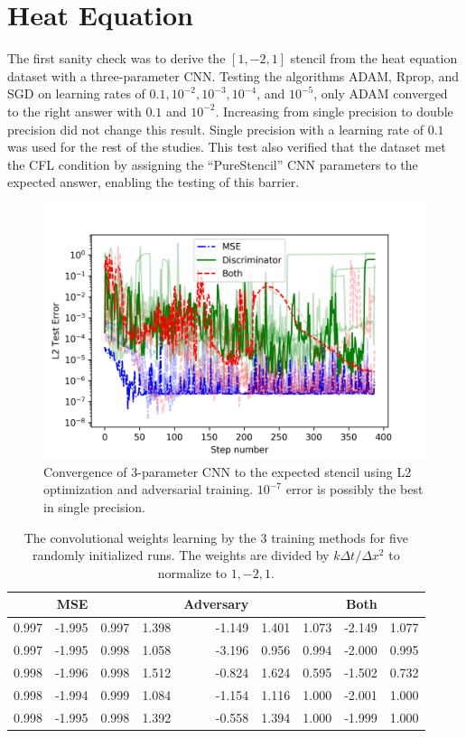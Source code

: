 \documentclass{article}
\begin{document}
\section{Heat Equation}

The first sanity check was to derive the $[1,-2,1]$ stencil from the heat equation dataset with a three-parameter CNN.
Testing the algorithms ADAM, Rprop, and SGD on learning rates of $0.1, 10^{-2}, 10^{-3}, 10^{-4}$, and $10^{-5}$, only ADAM converged to the right answer with $0.1$ and $10^{-2}$. Increasing from single precision to double precision did not change this result. Single precision with a learning rate of $0.1$ was used for the rest of the studies.
This test also verified that the dataset met the CFL condition by assigning the ``PureStencil'' CNN parameters to the expected answer, enabling the testing of this barrier.

\begin{figure}
  \centering
  \includegraphics[width=5in]{3pt_L2_loss.png}
  \caption{Convergence of 3-parameter CNN to the expected stencil
    using L2 optimization and adversarial
    training. $10^{-7}$ error is possibly the best in single precision.}
\end{figure}

\begin{table}
  \caption{The convolutional weights learning by the 3 training
    methods for five randomly initialized runs. The weights are
    divided by $k \Delta t / \Delta x^2$ to normalize to $1,-2,1$.}
  \begin{tabular}{rrr|rrr|rrr}
    \hline
    &MSE& & &Adversary& & &Both& \\
\hline
 0.997 & -1.995 & 0.997 & 1.398 & -1.149 & 1.401 & 1.073 & -2.149 & 1.077 \\
 0.997 & -1.995 & 0.998 & 1.058 & -3.196 & 0.956 & 0.994 & -2.000 & 0.995 \\
 0.998 & -1.996 & 0.998 & 1.512 & -0.824 & 1.624 & 0.595 & -1.502 & 0.732 \\
 0.998 & -1.994 & 0.999 & 1.084 & -1.154 & 1.116 & 1.000 & -2.001 & 1.000 \\
 0.998 & -1.995 & 0.998 & 1.392 & -0.558 & 1.394 & 1.000 & -1.999 & 1.000 \\
\hline
\end{tabular}
  \end{table}
\end{document}
